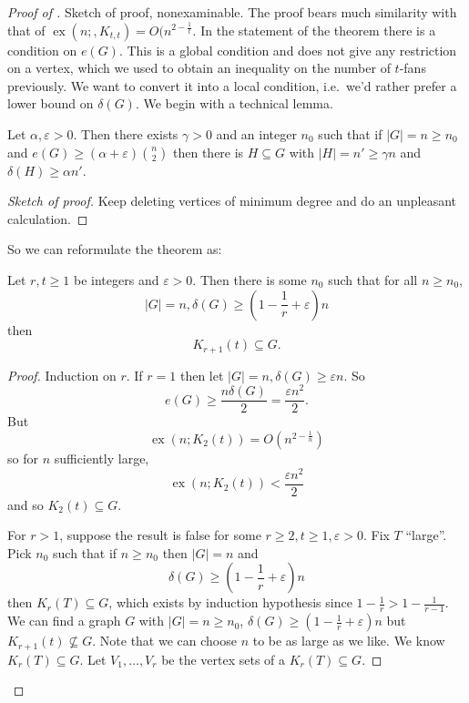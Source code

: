 \documentclass[a4paper]{article}
\DeclareMathOperator{\exx}{ex} %
\begin{document}
\begin{proof}[Proof of ]
  Sketch of proof, nonexaminable. The proof bears much similarity with that of \(\exx(n;, K_{t, t}) = O(n^{2 - \frac{1}{t}}\). In the statement of the theorem there is a condition on \(e(G)\). This is a global condition and does not give any restriction on a vertex, which we used to obtain an inequality on the number of \(t\)-fans previously. We want to convert it into a local condition, i.e.\ we'd rather prefer a lower bound on \(\delta(G)\). We begin with a technical lemma.
  \begin{lemma}
    Let \(\alpha, \varepsilon > 0\). Then there exists \(\gamma > 0\) and an integer \(n_0\) such that if \(|G| = n \geq n_0\) and \(e(G) \geq (\alpha + \varepsilon) \binom{n}{2}\) then there is \(H \subseteq G\) with \(|H| = n' \geq \gamma n\) and \(\delta(H) \geq \alpha n'\).
  \end{lemma}

  \begin{proof}[Sketch of proof]
    Keep deleting vertices of minimum degree and do an unpleasant calculation.
  \end{proof}

  So we can reformulate the theorem as:

\begin{theorem}
  Let \(r, t \geq 1\) be integers and \(\varepsilon > 0\). Then there is some \(n_0\) such that for all \(n \geq n_0\),
  \[
    |G| = n, \delta(G) \geq (1 - \frac{1}{r} + \varepsilon) n
  \]
  then
  \[
    K_{r + 1}(t) \subseteq G.
  \]
\end{theorem}

\begin{proof}
  Induction on \(r\). If \(r = 1\) then let \(|G| = n, \delta(G) \geq \varepsilon n\). So
  \[
    e(G) \geq \frac{n\delta(G)}{2} = \frac{\varepsilon n^2}{2}.
  \]
  But
  \[
    \exx(n; K_2(t)) = O(n^{2 - \frac{1}{n}})
  \]
  so for \(n\) sufficiently large,
  \[
    \exx(n; K_2(t)) < \frac{\varepsilon n^2}{2}
  \]
  and so \(K_2(t) \subseteq G\).

  For \(r > 1\), suppose the result is false for some \(r \geq 2, t \geq 1, \varepsilon > 0\). Fix \(T\) ``large''. Pick \(n_0\) such that if \(n \geq n_0\) then \(|G| = n\) and
  \[
    \delta(G) \geq (1 - \frac{1}{r} + \varepsilon)n
  \]
  then \(K_r(T) \subseteq G\), which exists by induction hypothesis since \(1 - \frac{1}{r} > 1 - \frac{1}{r - 1}\). We can find a graph \(G\) with \(|G| = n  \geq n_0\), \(\delta(G) \geq (1 - \frac{1}{r} + \varepsilon)n\) but \(K_{r + 1}(t) \nsubseteq G\). Note that we can choose \(n\) to be as large as we like. We know \(K_r(T) \subseteq G\). Let \(V_1, \dots, V_r\) be the vertex sets of a \(K_r(T) \subseteq G\).


\end{proof}
\end{proof}
\end{document}
